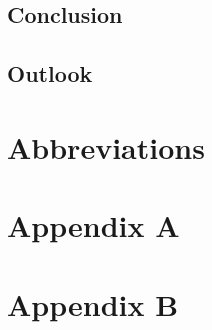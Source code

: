 \section{Conclusion}\label{conclusion}

\section{Outlook}\label{outlook}

\chapter{Abbreviations}

\printbibliography

\chapter{Appendix A}\label{appendix a}

\chapter{Appendix B}\label{appendix b}
%


